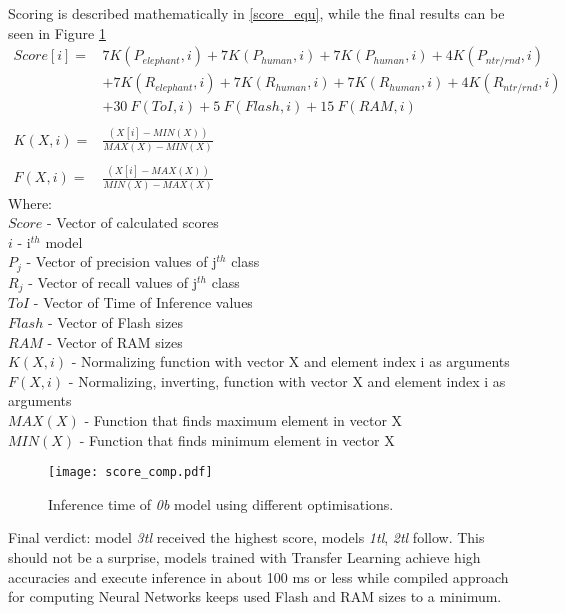 Scoring is described mathematically in \ref{score_equ}, while the final results can be seen in Figure \ref{score_comp}
\begin{equation}\label{score_equ}
    \begin{aligned}
        Score[i] ={} & 7 K(P_{elephant},i) + 7 K(P_{human},i) + 7 K(P_{human},i) + 4 K(P_{ntr/rnd},i) \\
                     & +{} 7 K(R_{elephant},i) + 7 K(R_{human},i) + 7 K(R_{human},i) + 4 K(R_{ntr/rnd},i) \\
                  & +{} 30\: F(ToI, i) +5\: F(Flash, i) + 15\: F(RAM, i)   \\
                  & \\
        K(X, i) ={}  & \frac{(X[i] - MIN(X))}{MAX(X)- MIN(X)} \\
                  & \\
        F(X, i) ={}  & \frac{(X[i] - MAX(X))}{MIN(X)- MAX(X)}
    \end{aligned}
\end{equation}
\clearpage
Where:\\
$Score$ - Vector of calculated scores\\
$i$ - i$^{th}$ model\\
$P_{j}$ - Vector of precision values of j$^{th}$ class\\
$R_{j}$ - Vector of recall values of j$^{th}$ class\\
$ToI$ - Vector of Time of Inference values\\
$Flash$ - Vector of Flash sizes\\
$RAM$ - Vector of RAM sizes\\
$K(X,i)$ - Normalizing function with vector X and element index i as arguments\\
$F(X,i)$ - Normalizing, inverting, function with vector X and element index i as arguments\\
$MAX(X)$ - Function that finds maximum element in vector X\\
$MIN(X)$ - Function that finds minimum element in vector X

\begin{figure}[ht]
    \centering
    \texttt{[image: score\_comp.pdf]}
    \caption{ Inference time of \textit{0b} model using different optimisations.}
    \label{score_comp}
\end{figure}

Final verdict: model \textit{3tl} received the highest score, models \textit{1tl}, \textit{2tl} follow.
This should not be a surprise, models trained with Transfer Learning achieve high accuracies and execute inference in about 100 ms or less while compiled approach for computing Neural Networks keeps used Flash and RAM sizes to a minimum.


